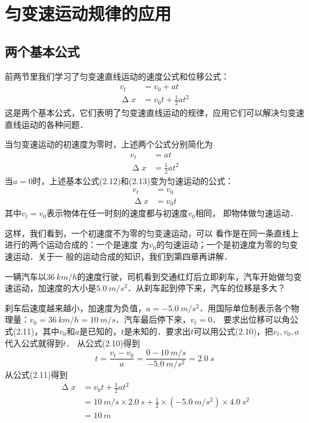 \section{匀变速运动规律的应用}

\subsection{两个基本公式}

前两节里我们学习了匀变速直线运动的速度公式和位移公式：
\begin{align}
    v_t        & =v_0+at                \\
    \upDelta x & =v_0 t+\frac{1}{2}at^2
\end{align}
这是两个基本公式，它们表明了匀变速直线运动的规律，应用它们可以解决匀变速直线运动的各种问题．

当匀变速运动的初速度为零时，上述两个公式分别简化为
\begin{align}
    v_t        & =at              \\
    \upDelta x & =\frac{1}{2}at^2
\end{align}
当$a=0$时，上述基本公式(2.12)和(2.13)变为匀速运动的公式：
\[\begin{split}
        v_t        & =v_0  \\
        \upDelta x & =v_0t
    \end{split}\]
其中$v_t=v_0$表示物体在任一时刻的速度都与初速度$v_0$相同，
即物体做匀速运动．

这样，我们看到，一个初速度不为零的匀变速运动，可以
看作是在同一条直线上进行的两个运动合成的：一个是速度
为$v_0$的匀速运动；一个是初速度为零的匀变速运动．关于一
般的运动合成的知识，我们到第四章再讲解．

\begin{Example}
    一辆汽车以$\qty{36}{km/h}$的速度行驶，司机看到交通红灯后立即刹车，汽车开始做匀变速运动，加速度的大小是$\qty{5.0}{m/s^2}$．从刹车起到停下来，汽车的位移是多大？
\end{Example}

\begin{Answer}
    刹车后速度越来越小，加速度为负值，$a=\qty{-5.0}{m/s^2}$．用国际单位制表示各个物理量：$v_0=\qty{36}{km/h}=\qty{10}{m/s}$．汽车最后停下来，$v_t=0$．
    要求出位移可以角公式(2.11)，其中$v_0$和$a$是已知的，$t$是未知的．要求出$t$可以用公式(2.10)，把$v_t,v_0,a$代入公式就得到$t$．
    从公式(2.10)得到
    \[t=\frac{v_t-v_0}{a}=\frac{0-\qty{10}{m/s}}{\qty{-5.0}{m/s^2}}=\qty{2.0}{s}\]
    从公式(2.11)得到
    \[\begin{split}
            \upDelta x & =v_0t+\frac{1}{2}at^2                                                                          \\
                       & =\qty{10}{m/s} \times \qty{2.0}{s}+\frac{1}{2}\times (\qty{-5.0}{m/s^2}) \times \qty{4.0}{s^2} \\
                       & =\qty{10}{m}
        \end{split} \]
\end{Answer}

